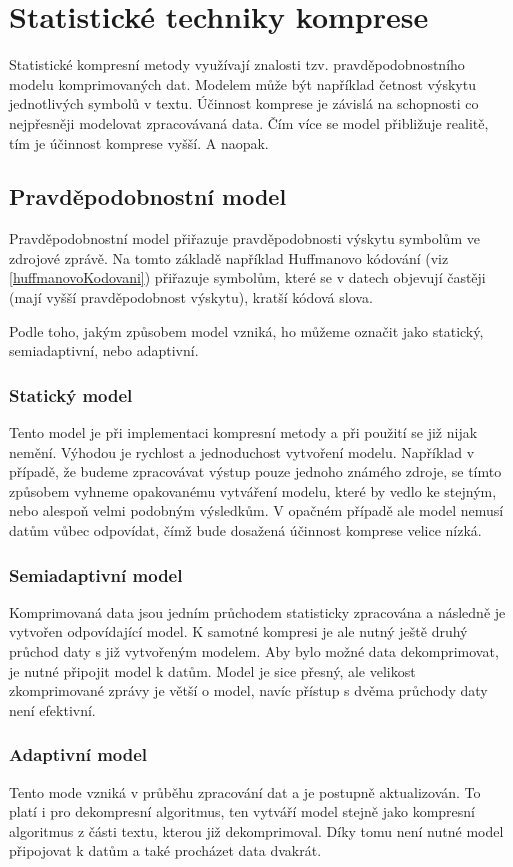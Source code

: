 \chapter{Statistické techniky komprese}
Statistické kompresní metody využívají znalosti tzv. pravděpodobnostního modelu komprimovaných dat. Modelem může být například četnost výskytu jednotlivých symbolů v textu. Účinnost komprese je závislá na schopnosti co nejpřesněji modelovat zpracovávaná data. Čím více se model přibližuje realitě, tím je účinnost komprese vyšší. A naopak.

\section{Pravděpodobnostní model}
\label{pravdepodobnostniModel}
Pravděpodobnostní model přiřazuje pravděpodobnosti výskytu symbolům ve zdrojové zprávě. Na tomto základě například Huffmanovo kódování (viz \ref{huffmanovoKodovani}) přiřazuje symbolům, které se v datech objevují častěji (mají vyšší pravděpodobnost výskytu), kratší kódová slova.

Podle toho, jakým způsobem model vzniká, ho můžeme označit jako statický, semiadaptivní, nebo adaptivní.

\subsection{Statický model}
Tento model je při implementaci kompresní metody a při použití se již nijak nemění. Výhodou je rychlost a jednoduchost vytvoření modelu. Například v případě, že budeme zpracovávat výstup pouze jednoho známého zdroje, se tímto způsobem vyhneme opakovanému vytváření modelu, které by vedlo ke stejným, nebo alespoň velmi podobným výsledkům. V opačném případě ale model nemusí datům vůbec odpovídat, čímž bude dosažená účinnost komprese velice nízká.

\subsection{Semiadaptivní model}
Komprimovaná data jsou jedním průchodem statisticky zpracována a následně je vytvořen odpovídající model. K samotné kompresi je ale nutný ještě druhý průchod daty s již vytvořeným modelem. Aby bylo možné data dekomprimovat, je nutné připojit model k datům. Model je sice přesný, ale velikost zkomprimované zprávy je větší o model, navíc přístup s dvěma průchody daty není efektivní.

\subsection{Adaptivní model}
Tento mode vzniká v průběhu zpracování dat a je postupně aktualizován. To platí i pro dekompresní algoritmus, ten vytváří model stejně jako kompresní algoritmus z části textu, kterou již dekomprimoval. Díky tomu není nutné model připojovat k datům a také procházet data dvakrát.

